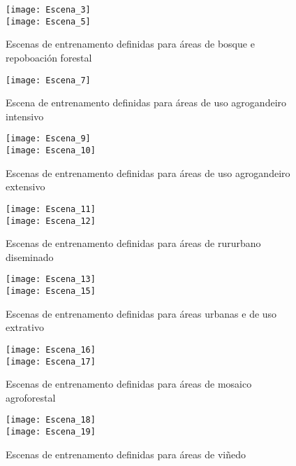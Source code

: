 \documentclass[11pt,a4paper]{article}
\begin{document}
\begin{figure}
\caption{Escenas de entrenamento definidas para áreas de bosque e repoboación forestal}\label{fig:escenas2}
\texttt{[image: Escena\_3]}\\
\texttt{[image: Escena\_5]}
\end{figure}

\begin{figure}
\caption{Escena de entrenamento definidas para áreas de uso agrogandeiro intensivo}\label{fig:escenas3}
\texttt{[image: Escena\_7]}
\end{figure}

\begin{figure}
\caption{Escenas de entrenamento definidas para áreas de uso agrogandeiro extensivo}\label{fig:escenas4}
\texttt{[image: Escena\_9]}\\
\texttt{[image: Escena\_10]}
\end{figure}

\begin{figure}
\caption{Escenas de entrenamento definidas para áreas de rururbano diseminado}\label{fig:escenas5}
\texttt{[image: Escena\_11]}\\
\texttt{[image: Escena\_12]}
\end{figure}

\begin{figure}
\caption{Escenas de entrenamento definidas para áreas urbanas e de uso extrativo}\label{fig:escenas6}
\texttt{[image: Escena\_13]}\\
\texttt{[image: Escena\_15]}
\end{figure}

\begin{figure}
\caption{Escenas de entrenamento definidas para áreas de mosaico agroforestal}\label{fig:escenas7}
\texttt{[image: Escena\_16]}\\
\texttt{[image: Escena\_17]}
\end{figure}

\begin{figure}
\caption{Escenas de entrenamento definidas para áreas de viñedo}\label{fig:escenas8}
\texttt{[image: Escena\_18]}\\
\texttt{[image: Escena\_19]}
\end{figure}

\clearpage
\end{document}
